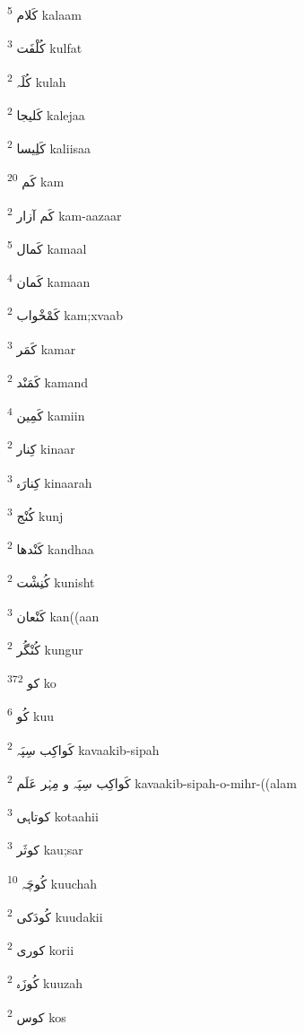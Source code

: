 \documentclass[12pt]{article}
\begin{document}
\begin{RTL}
\begin{multicols}{5}
{\ur کَلام}   \textsuperscript{5} kalaam

{\ur کُلْفَت}   \textsuperscript{3} kulfat

{\ur کُلَہ}   \textsuperscript{2} kulah

{\ur کَلیجا}   \textsuperscript{2} kalejaa

{\ur کَلِیسا}   \textsuperscript{2} kaliisaa

{\ur کَم}   \textsuperscript{20} kam

{\ur کَم آزار}   \textsuperscript{2} kam-aazaar

{\ur کَمال}   \textsuperscript{5} kamaal

{\ur کَمان}   \textsuperscript{4} kamaan

{\ur کَمْخْواب}   \textsuperscript{2} kam;xvaab

{\ur کَمَر}   \textsuperscript{3} kamar

{\ur کَمَنْد}   \textsuperscript{2} kamand

{\ur کَمِین}   \textsuperscript{4} kamiin

{\ur کِنار}   \textsuperscript{2} kinaar

{\ur کِنارَہ}   \textsuperscript{3} kinaarah

{\ur کُنْج}   \textsuperscript{3} kunj

{\ur کَنْدھا}   \textsuperscript{2} kandhaa

{\ur کُنِشْت}   \textsuperscript{2} kunisht

{\ur کَنْعان}   \textsuperscript{3} kan((aan

{\ur کُنْگُر}   \textsuperscript{2} kungur

{\ur کو}   \textsuperscript{372} ko

{\ur کُو}   \textsuperscript{6} kuu

{\ur کَواکِب سِپَہ}   \textsuperscript{2} kavaakib-sipah

{\ur کَواکِب سِپَہ و مِہْر عَلَم}   \textsuperscript{2} kavaakib-sipah-o-mihr-((alam

{\ur کوتاہی}   \textsuperscript{3} kotaahii

{\ur کوثَر}   \textsuperscript{3} kau;sar

{\ur کُوچَہ}   \textsuperscript{10} kuuchah

{\ur کُودَکی}   \textsuperscript{2} kuudakii

{\ur کوری}   \textsuperscript{2} korii

{\ur کُوزَہ}   \textsuperscript{2} kuuzah

{\ur کوس}   \textsuperscript{2} kos


\end{multicols}
\end{RTL}
\end{document}
